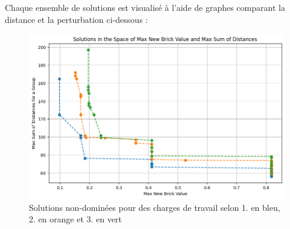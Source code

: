 Chaque ensemble de solutions est visualisé à l’aide de graphes comparant la distance et la perturbation ci-dessous :

\begin{figure}[H]
    \centering
    \includegraphics[width=\textwidth]{Images/step_1/step_1-min-distance.png}
    \caption{Solutions non-dominées pour des charges de travail selon 1. en bleu, 2. en orange et 3. en vert}
    \label{fig:nom_de_reference}
\end{figure}
